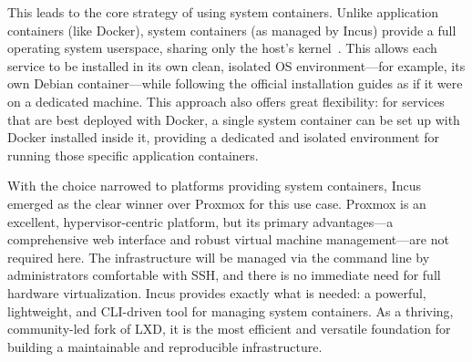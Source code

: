 This leads to the core strategy of using system containers. Unlike application containers (like Docker), system containers (as managed by Incus) provide a full operating system userspace, sharing only the host's kernel~\cite{incus-linux-containers-2023}. This allows each service to be installed in its own clean, isolated OS environment—for example, its own Debian container—while following the official installation guides as if it were on a dedicated machine. This approach also offers great flexibility: for services that are best deployed with Docker, a single system container can be set up with Docker installed inside it, providing a dedicated and isolated environment for running those specific application containers.

With the choice narrowed to platforms providing system containers, Incus emerged as the clear winner over Proxmox for this use case. Proxmox is an excellent, hypervisor-centric platform, but its primary advantages—a comprehensive web interface and robust virtual machine management—are not required here. The infrastructure will be managed via the command line by administrators comfortable with SSH, and there is no immediate need for full hardware virtualization. Incus provides exactly what is needed: a powerful, lightweight, and CLI-driven tool for managing system containers. As a thriving, community-led fork of LXD, it is the most efficient and versatile foundation for building a maintainable and reproducible infrastructure.
